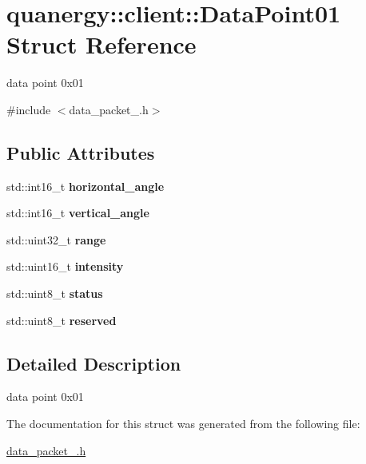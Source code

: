 \hypertarget{structquanergy_1_1client_1_1DataPoint01}{\section{quanergy\-:\-:client\-:\-:Data\-Point01 Struct Reference}
\label{structquanergy_1_1client_1_1DataPoint01}
}


data point 0x01  




{\ttfamily \#include $<$data\-\_\-packet\-\_.\-h$>$}

\subsection*{Public Attributes}
\begin{DoxyCompactItemize}
\item 
\hypertarget{structquanergy_1_1client_1_1DataPoint01_a12c6c56981db3dca0fbbc82a22fa408f}{std\-::int16\-\_\-t {\bfseries horizontal\-\_\-angle}}\label{structquanergy_1_1client_1_1DataPoint01_a12c6c56981db3dca0fbbc82a22fa408f}

\item 
\hypertarget{structquanergy_1_1client_1_1DataPoint01_a1e0a54d88a120aafb787f2039b15a286}{std\-::int16\-\_\-t {\bfseries vertical\-\_\-angle}}\label{structquanergy_1_1client_1_1DataPoint01_a1e0a54d88a120aafb787f2039b15a286}

\item 
\hypertarget{structquanergy_1_1client_1_1DataPoint01_ab6f942353ba69e35cc44f5e08d6db0b4}{std\-::uint32\-\_\-t {\bfseries range}}\label{structquanergy_1_1client_1_1DataPoint01_ab6f942353ba69e35cc44f5e08d6db0b4}

\item 
\hypertarget{structquanergy_1_1client_1_1DataPoint01_a52b701b904c3651a77ca803e5877a870}{std\-::uint16\-\_\-t {\bfseries intensity}}\label{structquanergy_1_1client_1_1DataPoint01_a52b701b904c3651a77ca803e5877a870}

\item 
\hypertarget{structquanergy_1_1client_1_1DataPoint01_a505fcd319dc02759aff13b713e21e1fc}{std\-::uint8\-\_\-t {\bfseries status}}\label{structquanergy_1_1client_1_1DataPoint01_a505fcd319dc02759aff13b713e21e1fc}

\item 
\hypertarget{structquanergy_1_1client_1_1DataPoint01_abc240b9f69302356ab0514bb6578366d}{std\-::uint8\-\_\-t {\bfseries reserved}}\label{structquanergy_1_1client_1_1DataPoint01_abc240b9f69302356ab0514bb6578366d}

\end{DoxyCompactItemize}


\subsection{Detailed Description}
data point 0x01 

The documentation for this struct was generated from the following file\-:\begin{DoxyCompactItemize}
\item 
\hyperlink{data__packet__01_8h}{data\-\_\-packet\-\_.\-h}\end{DoxyCompactItemize}
